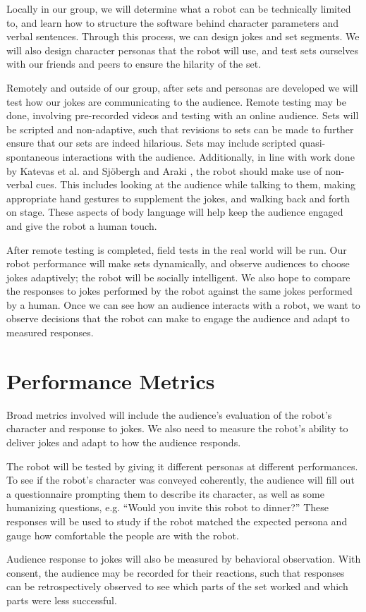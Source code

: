\documentclass[onecolumn, draftclsnofoot,10pt, compsoc]{IEEEtran}
\begin{document}
	Locally in our group, we will determine what a robot can be technically limited to, and learn how to structure the software behind character parameters and verbal sentences. Through this process, we can design jokes and set segments. We will also design character personas that the robot will use, and test sets ourselves with our friends and peers to ensure the hilarity of the set.

	Remotely and outside of our group, after sets and personas are developed we will test how our jokes are communicating to the audience. Remote testing may be done, involving pre-recorded videos and testing with an online audience. Sets will be scripted and non-adaptive, such that revisions to sets can be made to further ensure that our sets are indeed hilarious. Sets may include scripted quasi-spontaneous interactions with the audience. Additionally, in line with work done by Katevas et al. {\cite{RobotComedyLab:2015}} and Sj{\"o}bergh and Araki {\cite{RobotsMakeThings:2008}}, the robot should make use of non-verbal cues. This includes looking at the audience while talking to them, making appropriate hand gestures to supplement the jokes, and walking back and forth on stage. These aspects of body language will help keep the audience engaged and give the robot a human touch.

	After remote testing is completed, field tests in the real world will be run. Our robot performance will make sets dynamically, and observe audiences to choose jokes adaptively; the robot will be socially intelligent. We also hope to compare the responses to jokes performed by the robot against the same jokes performed by a human. Once we can see how an audience interacts with a robot, we want to observe decisions that the robot can make to engage the audience and adapt to measured responses.


\section{Performance Metrics}

Broad metrics involved will include the audience’s evaluation of the robot’s character and response to jokes. We also need to measure the robot’s ability to deliver jokes and adapt to how the audience responds.

The robot will be tested by giving it different personas at different performances. To see if the robot’s character was conveyed coherently, the audience will fill out a questionnaire prompting them to describe its character, as well as some humanizing questions, e.g. “Would you invite this robot to dinner?” These responses will be used to study if the robot matched the expected persona and gauge how comfortable the people are with the robot.

Audience response to jokes will also be measured by behavioral observation. With consent, the audience may be recorded for their reactions, such that responses can be retrospectively observed to see which parts of the set worked and which parts were less successful.



\end{document}
